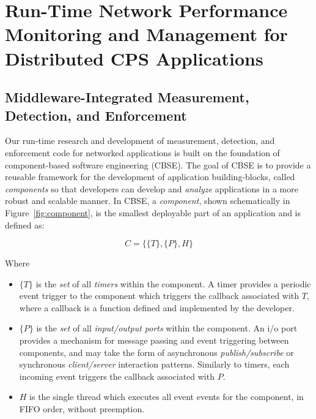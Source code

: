 \chapter{Run-Time Network Performance Monitoring and Management for Distributed CPS Applications}
\label{ch:runTime}

\section{Middleware-Integrated Measurement, Detection, and Enforcement}
\label{sec:middleware}

Our run-time research and development of measurement, detection, and
enforcement code for networked applications is built on the foundation
of component-based software engineering (CBSE).  The goal of CBSE is
to provide a reusable framework for the development of application
building-blocks, called \emph{components} so that developers can develop
and \emph{analyze} applications in a more robust and scalable manner.  In
CBSE, a \emph{component}, shown schematically in
Figure~\ref{fig:component}, is the smallest deployable part of an
application and is defined as:

\begin{equation}
  C = \{\{T\},\{P\},H\}
\end{equation}

Where

\begin{itemize}
\item $\{T\}$ is the \emph{set} of all \emph{timers} within the component.  A
  timer provides a periodic event trigger to the component which
  triggers the callback associated with $T$, where a callback is a
  function defined and implemented by the developer.  
\item $\{P\}$ is the \emph{set} of all \emph{input/output ports} within the
  component.  An i/o port provides a mechanism for message passing and
  event triggering between components, and may take the form of
  asynchronous \emph{publish/subscribe} or synchronous \emph{client/server}
  interaction patterns.  Similarly to timers, each incoming event
  triggers the callback associated with $P$.
\item $H$ is the single thread which executes all event events for
  the component, in FIFO order, without preemption.  
\end{itemize}


